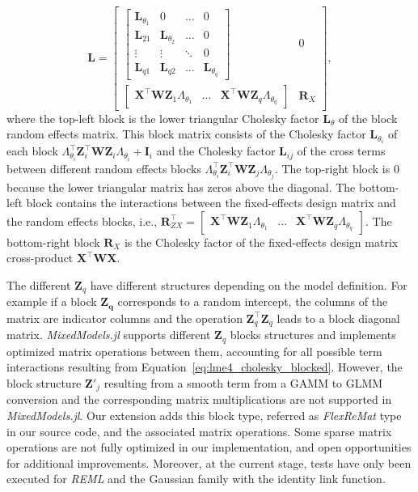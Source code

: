 \begin{equation}
\mathbf{L} =
\left[
\begin{array}{cc}
\begin{bmatrix}
\mathbf{L}_{\theta_1} & 0 & \dots & 0 \\
\mathbf{L}_{21} & \mathbf{L}_{\theta_2} & \dots & 0 \\
\vdots & \vdots & \ddots & 0 \\
\mathbf{L}_{q1} & \mathbf{L}_{q2} & \dots & \mathbf{L}_{\theta_q}
\end{bmatrix}
&
0 \\
\begin{bmatrix}
\mathbf{X}^\top \mathbf{W} \mathbf{Z}_1 \Lambda_{\theta_1} & \dots & \mathbf{X}^\top \mathbf{W} \mathbf{Z}_q \Lambda_{\theta_q}
\end{bmatrix}
&
\mathbf{R}_{X}
\end{array}
\right], 
\end{equation}
where the top-left block is the lower triangular Cholesky factor $\mathbf{L}_{\theta}$ of the block random effects matrix. This block matrix consists of the Cholesky factor $\mathbf{L}_{\theta_i}$ of each block $\Lambda_{\theta_i}^\top \mathbf{Z}_i^\top \mathbf{W} \mathbf{Z}_i \Lambda_{\theta_i} + \mathbf{I}_i$ and the Cholesky factor $\mathbf{L}_{ij}$ of the cross terms between different random effects blocks $\Lambda_{\theta_i}^\top \mathbf{Z}_i^\top \mathbf{W} \mathbf{Z}_j \Lambda_{\theta_j}$. The top-right block is $0$ because the lower triangular matrix has zeros above the diagonal. The bottom-left block contains the interactions between the fixed-effects design matrix and the random effects blocks, i.e., $\mathbf{R}_{ZX}^\top = \begin{bmatrix} \mathbf{X}^\top \mathbf{W} \mathbf{Z}_1 \Lambda_{\theta_1} & \dots & \mathbf{X}^\top \mathbf{W} \mathbf{Z}_q \Lambda_{\theta_q} \end{bmatrix}$. The bottom-right block $\mathbf{R}_{X}$ is the Cholesky factor of the fixed-effects design matrix cross-product $\mathbf{X}^\top \mathbf{W} \mathbf{X}$.

The different $\mathbf{Z}_q$ have different structures depending on the model definition. For example if a block $\mathbf{Z_q}$ corresponds to a random intercept, the columns of the matrix are indicator columns and the operation $\mathbf{Z}_q^{\top}\mathbf{Z}_q$ leads to a block diagonal matrix. \textit{MixedModels.jl} supports different $\mathbf{Z}_q$ blocks structures and implements optimized matrix operations between them, accounting for all possible term interactions resulting from Equation~\ref{eq:lme4_cholesky_blocked}. However, the block structure $\mathbf{Z}'_j$ resulting from a smooth term from a GAMM to GLMM conversion and the corresponding matrix multiplications are not supported in \textit{MixedModels.jl}. Our extension adds this block type, referred as \textit{FlexReMat} type in our source code, and the associated matrix operations. Some sparse matrix operations are not fully optimized in our implementation, and open opportunities for additional improvements. Moreover, at the current stage, tests have only been executed for \textit{REML} and the Gaussian family with the identity link function. 

